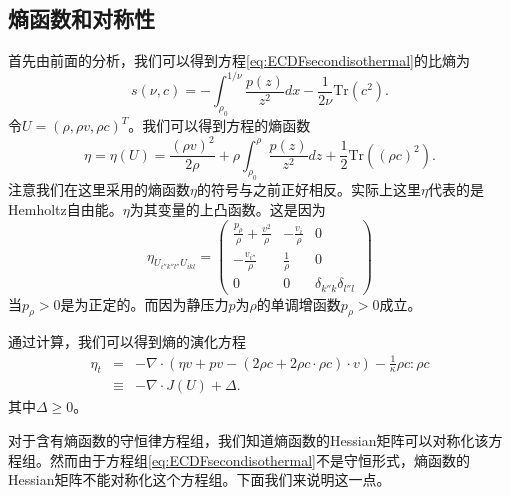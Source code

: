 \subsection{熵函数和对称性}
首先由前面的分析，我们可以得到方程\eqref{eq:ECDFsecondisothermal}的比熵为
\begin{equation*}
	s (\nu, c ) =  -\int_{\rho_0}^{1/\nu} \frac{p(z)}{z^2} dx - \frac{1}{2 \nu}  \mbox{Tr} (c^2).
\end{equation*}
令$U = (\rho, \rho v, \rho c)^T$。我们可以得到方程的熵函数
\begin{equation*}
	\eta = \eta(U) = \frac{(\rho v)^2}{2\rho}+\rho \int_{\rho_0}^{\rho} \frac{p(z)}{z^2} dz + \frac{1}{2}  \mbox{Tr} \left((\rho c)^2\right).
\end{equation*}
注意我们在这里采用的熵函数$\eta$的符号与之前正好相反。实际上这里$\eta$代表的是Hemholtz自由能。$\eta$为其变量的上凸函数。这是因为
\begin{equation*}
	\eta_{U_{i''k''l''}U_{ikl}} = \left( \begin{array}{ccc} 
		\frac{p_\rho}{\rho} + \frac{v^2}{\rho} & -\frac{v_i}{\rho} & 0 \\
		-\frac{v_{i''}}{\rho} & \frac{1}{\rho} & 0 \\
		0 & 0 & \delta_{k''k}\delta_{l''l}
	\end{array}\right)
\end{equation*}
当$p_\rho>0$是为正定的。而因为静压力$p$为$\rho$的单调增函数$p_\rho>0$成立。

通过计算，我们可以得到熵的演化方程
\begin{eqnarray}\label{23}
	\eta_t &=&  - \nabla \cdot ( \eta v+ p v - (2\rho c + 2 \rho c \cdot \rho c) \cdot v) - \frac{1}{\kappa} \rho c: \rho c \nonumber\\
  &\equiv& -\nabla \cdot J(U) + \Delta.	
\end{eqnarray}
其中$\Delta \ge 0$。

对于含有熵函数的守恒律方程组\cite{friedrichs1971systems}，我们知道熵函数的Hessian矩阵可以对称化该方程组。然而由于方程组\eqref{eq:ECDFsecondisothermal}不是守恒形式，熵函数的Hessian矩阵不能对称化这个方程组。下面我们来说明这一点。

